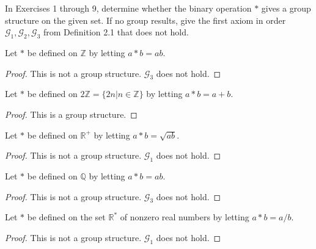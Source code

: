 In Exercises 1 through 9, determine whether the binary operation $*$ gives a group structure on the given set. If no group results, give the first axiom in order $\mathcal{G}_{1}, \mathcal{G}_{2}, \mathcal{G}_{3}$ from Definition 2.1 that does not hold.

\begin{exercise}
    Let $*$ be defined on $\mathbb{Z}$ by letting $a * b = ab$.
\end{exercise}

\begin{proof}
    This is not a group structure. $\mathcal{G}_{3}$ does not hold.
\end{proof}

\begin{exercise}
    Let $*$ be defined on $2\mathbb{Z} = \{ 2n \vert n\in\mathbb{Z} \}$ by letting $a * b = a + b$.
\end{exercise}

\begin{proof}
    This is a group structure.
\end{proof}

\begin{exercise}
    Let $*$ be defined on $\mathbb{R}^{+}$ by letting $a * b = \sqrt{ab}$.
\end{exercise}

\begin{proof}
    This is not a group structure. $\mathcal{G}_{1}$ does not hold.
\end{proof}

\begin{exercise}
    Let $*$ be defined on $\mathbb{Q}$ by letting $a * b = ab$.
\end{exercise}

\begin{proof}
    This is not a group structure. $\mathcal{G}_{3}$ does not hold.
\end{proof}

\begin{exercise}
    Let $*$ be defined on the set $\mathbb{R}^{*}$ of nonzero real numbers by letting $a * b = a/b$.
\end{exercise}

\begin{proof}
    This is not a group structure. $\mathcal{G}_{1}$ does not hold.
\end{proof}

